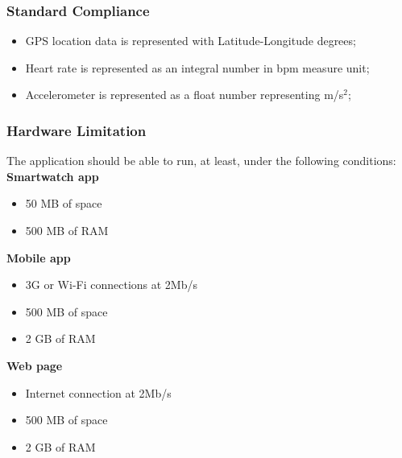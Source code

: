 \subsubsection{Standard Compliance}
\begin{itemize}
    \item GPS location data is represented with Latitude-Longitude degrees;
    \item Heart rate is represented as an integral number in bpm measure unit;
    \item Accelerometer is represented as a float number representing m/s$^2$;
\end{itemize}

\subsubsection{Hardware Limitation}
The application should be able to run, at least, under the following conditions: 
\textbf{Smartwatch app}
\begin{itemize}
    \item 50 MB of space
    \item 500 MB of RAM
\end{itemize}
\textbf{Mobile app}
\begin{itemize}
    \item 3G or Wi-Fi connections at 2Mb/s 
    \item 500 MB of space
    \item 2 GB of RAM
\end{itemize}
\textbf{Web page}
\begin{itemize}
    \item Internet connection at 2Mb/s 
    \item 500 MB of space
    \item 2 GB of RAM 
\end{itemize}


